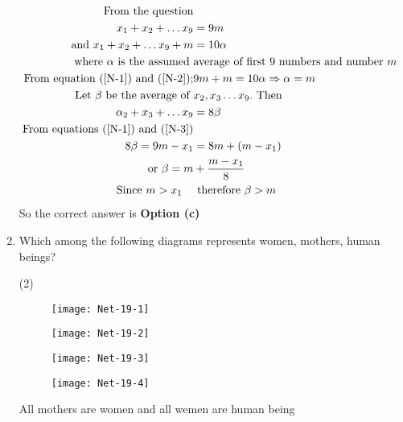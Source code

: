\begin{enumerate}
\begin{tasks}
	\end{tasks}
\begin{answer}
	\begin{align}
\text{ From the question}\notag\\
	x_{1}+x_{2}+\ldots x_{9}&=9 m \label{N-1} \\
	\text { and } x_{1}+x_{2}+\ldots x_{9}+m&=10 \alpha \label{N-2} \\
\text{	where $\alpha$ is the assumed }&\text{average of first 9 numbers and number $m$}\notag\\
\text{	From equation (\ref{N-1}) and (\ref{N-2});} &\text{$9 m+m=10 \alpha \Rightarrow \alpha=m$}\notag\\
\text{	Let $\beta$ be the average of }&x_{2}, x_{3} \ldots x_{9}. \text{ Then}\notag\\
\alpha_{2}+x_{3}+\ldots x_{9}&=8 \beta \label{N-3} \\
\text{From equations (\ref{N-1}) and (\ref{N-3})}\notag\\
8 \beta=9 m-x_{1}&=8 m+\left(m-x_{1}\right)\notag\\
\text{or }\beta=m&+\frac{m-x_{1}}{8}\notag\\
\text{Since $m>x_{1} $\quad}&\text{ therefore }\beta>m\notag
	\end{align}
	So the correct answer is \textbf{Option (c)}
\end{answer}
\item  Which among the following diagrams represents women, mothers, human beings?
	 \begin{tasks}(2)
		\task[\textbf{a.}]
		\begin{figure}[H]
			\centering
			\texttt{[image: Net-19-1]}
		\end{figure}
		\task[\textbf{b.}]
		\begin{figure}[H]
			\centering
			\texttt{[image: Net-19-2]}
		\end{figure}
		\task[\textbf{c.}]
		\begin{figure}[H]
			\centering
			\texttt{[image: Net-19-3]}
		\end{figure}
		\task[\textbf{d.}] 
		\begin{figure}[H]
			\centering
			\texttt{[image: Net-19-4]}
		\end{figure}
	\end{tasks}
\begin{answer}
All mothers are women and all wemen are human being\\

\end{answer}
\end{enumerate}
